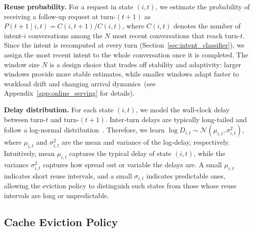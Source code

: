 \documentclass{article}
\newcommand{\bo}[1]{\textcolor{red}{[Bo: #1]}}
\begin{document}
\textbf{Reuse probability.}
For a request in state \((i,t)\), we estimate the probability of receiving a follow-up request at turn-\((t+1)\) as \(P(t+1 \mid i,t) = C(i,t+1) / C(i,t)\), where \(C(i,t)\) denotes the number of intent-\(i\) conversations among the \(N\) most recent conversations that reach turn-\(t\). Since the intent is recomputed at every turn (Section~\ref{sec:intent_classifier}), we assign the most recent intent to the whole conversation once it is completed.
The window size \(N\) is a design choice that trades off stability and adaptivity: larger windows provide more stable estimates, while smaller windows adapt faster to workload drift and changing arrival dynamics~(see Appendix~\ref{app:online_serving} for details). 

\textbf{Delay distribution.}
For each state \((i,t)\), we model the wall-clock delay between turn-\(t\) and turn-\((t+1)\). Inter-turn delays are typically long-tailed and follow a log-normal distribution~\cite{servegen}. Therefore, we learn \(\log D_{i,t} \sim \mathcal{N}(\mu_{i,t}, \sigma_{i,t}^2)\), where \(\mu_{i,t}\) and \(\sigma_{i,t}^2\) are the mean and variance of the log-delay, respectively. Intuitively, mean \(\mu_{i,t}\) captures the typical delay of state \((i,t)\), while the variance \(\sigma_{i,t}^2\) captures how spread out or variable the delays are. A small \(\mu_{i,t}\) indicates short reuse intervals, and a small \(\sigma_{i,t}\) indicates predictable ones, allowing the eviction policy to distinguish such states from those whose reuse intervals are long or unpredictable.

\vspace{-5pt}

\subsection{Cache Eviction Policy}
\label{sec:eviction_policy}
\vspace{-5pt}
\end{document}
